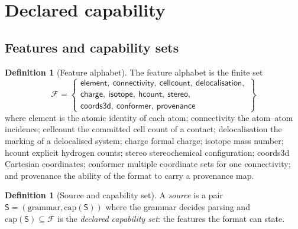 \documentclass[11pt,twocolumn,a4paper]{article}
\theoremstyle{msthm}
\theoremstyle{definition}
\newtheorem{definition}[theorem]{Definition}
\theoremstyle{remark}
\newcommand{\Src}{\mathsf{S}}
\newcommand{\Feat}{\mathcal{F}}
\newcommand{\Capset}{\mathrm{cap}}
\begin{document}
\section{Declared capability}
\label{sec:capability}

\subsection{Features and capability sets}

\begin{definition}[Feature alphabet]
\label{def:features}
The feature alphabet is the finite set
\[
\Feat=\left\{
\begin{array}{l}
\textsf{element},\ \textsf{connectivity},\ \textsf{cellcount},\
\textsf{delocalisation},\\
\textsf{charge},\ \textsf{isotope},\ \textsf{hcount},\
\textsf{stereo},\\
\textsf{coords3d},\ \textsf{conformer},\ \textsf{provenance}
\end{array}
\right\}
\]
where \textsf{element} is the atomic identity of each atom;
\textsf{connectivity} the atom--atom incidence; \textsf{cellcount} the
committed cell count of a contact; \textsf{delocalisation} the marking
of a delocalised system; \textsf{charge} formal charge; \textsf{isotope}
mass number; \textsf{hcount} explicit hydrogen counts;
\textsf{stereo} stereochemical configuration; \textsf{coords3d}
Cartesian coordinates; \textsf{conformer} multiple coordinate sets for
one connectivity; and \textsf{provenance} the ability of the format to
carry a provenance map.
\end{definition}

\begin{definition}[Source and capability set]
\label{def:source}
A \emph{source} is a pair $\Src=(\text{grammar},\Capset(\Src))$ where the
grammar decides parsing and $\Capset(\Src)\subseteq\Feat$ is the
\emph{declared capability set}: the features the format can state.
\end{definition}
\end{document}
